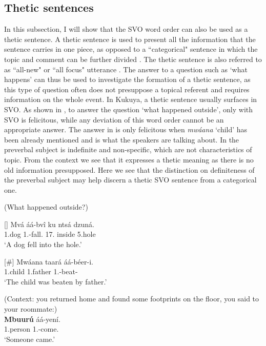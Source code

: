\documentclass[output=paper,colorlinks,citecolor=brown,
]{langscibook}
\begin{document}
\subsection{Thetic sentences}\label{teke:sec:2.3}
In this subsection, I will show that the SVO word order can also be used as a thetic sentence. A thetic sentence is used to present all the information that the sentence carries in one piece, as opposed to a ``categorical" sentence in which the topic and comment can be further divided \citep{Kuroda1972, Sasse1987, Sasse1996}. The thetic sentence is also referred to as ``all-new" or ``all focus" utterance \citep{vanderWal2021a}. The answer to a question such as `what happens' can thus be used to investigate the formation of a thetic sentence, as this type of question often does not presuppose a topical referent and requires information on the whole event. In Kukuya, a thetic sentence usually surfaces in SVO. As shown in , to answer the question `what happened outside', only  with SVO is felicitous, while any deviation of this word order cannot be an appropriate answer. The answer in  is only felicitous when \textit{mw\'{a}ana} `child' has been already mentioned and is what the speakers are talking about. In  the preverbal subject is indefinite and non-specific, which are not characteristics of topic. From the context we see that it expresses a thetic meaning as there is no old information presupposed. Here we see that the distinction on definiteness of the preverbal subject may help discern a thetic SVO sentence from a categorical one.
\begin{exe} 
    \ex (What happened outside?)\label{14}
    \begin{xlist}
\ex
[]{
\label{14a}
\gll
Mvá áá-bvî ku ntsá dzuná.\\
1.dog 1\Sm{}.\Pst{}-fall.\Pst{} 17.\Loc{} inside 5.hole\\
\trans ‘A dog fell into the hole.’
}

\ex
[\#]{
\label{14b}
\gll
Mwáana taará áá-béer-i.\\
1.child 1.father 1\Sm{}.\Pst{}-beat-\Pst{}\\
\trans ‘The child was beaten by father.’
}

    \end{xlist}
\end{exe}
\begin{exe}
\ex
\label{15}
 (Context: you returned home and found some footprints on the floor, you said to your roommate:) \\
\gll
\textbf{Mbuurú} áá-yení.\\
1.person 1\Sm{}.\Pst{}-come.\Pst{}\\
\trans ‘Someone came.’ 

\end{exe}
\end{document}
